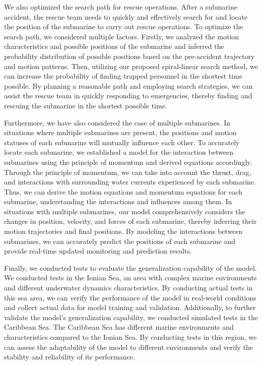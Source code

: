 \documentclass[12pt]{article}
\begin{document}
We also optimized the search path for rescue operations. After a submarine accident, the rescue team needs to quickly and effectively search for and locate the position of the submarine to carry out rescue operations. To optimize the search path, we considered multiple factors. Firstly, we analyzed the motion characteristics and possible positions of the submarine and inferred the probability distribution of possible positions based on the pre-accident trajectory and motion patterns. Then, utilizing our proposed spiral-linear search method, we can increase the probability of finding trapped personnel in the shortest time possible. By planning a reasonable path and employing search strategies, we can assist the rescue team in quickly responding to emergencies, thereby finding and rescuing the submarine in the shortest possible time.

Furthermore, we have also considered the case of multiple submarines. In situations where multiple submarines are present, the positions and motion statuses of each submarine will mutually influence each other. To accurately locate each submarine, we established a model for the interaction between submarines using the principle of momentum and derived equations accordingly. Through the principle of momentum, we can take into account the thrust, drag, and interactions with surrounding water currents experienced by each submarine. Thus, we can derive the motion equations and momentum equations for each submarine, understanding the interactions and influences among them. In situations with multiple submarines, our model comprehensively considers the changes in position, velocity, and forces of each submarine, thereby inferring their motion trajectories and final positions. By modeling the interactions between submarines, we can accurately predict the positions of each submarine and provide real-time updated monitoring and prediction results.

Finally, we conducted tests to evaluate the generalization capability of the model. We conducted tests in the Ionian Sea, an area with complex marine environments and different underwater dynamics characteristics. By conducting actual tests in this sea area, we can verify the performance of the model in real-world conditions and collect actual data for model training and validation. Additionally, to further validate the model's generalization capability, we conducted simulated tests in the Caribbean Sea. The Caribbean Sea has different marine environments and characteristics compared to the Ionian Sea. By conducting tests in this region, we can assess the adaptability of the model to different environments and verify the stability and reliability of its performance.
\end{document}
